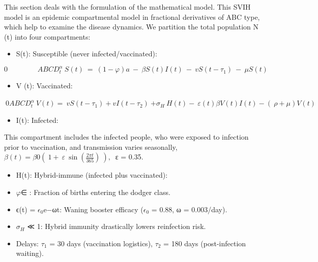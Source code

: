 \documentclass[10pt]{NSP1}
\begin{document}
\par\medskip{}\smallskip

This section deals with the formulation of the mathematical model. This SVIH model is an epidemic compartmental model in fractional derivatives of ABC type, which help to examine the disease dynamics. We partition the total population N (t) into four compartments:

\begin{itemize}
  \item S(t): Susceptible (never infected/vaccinated):
\end{itemize}

\begin{equation}
0\ \ \ \ \ \ \ \ \ \ \ \ \ \ \ \ \ \ \ ABCD_{t}^{\alpha}\ S(t)\  = \ (1 - \varphi)a\  - \ \beta S(t)I(t)\  - \ vS(t - \tau_{1})\  - \ \mu S(t)

\end{equation}

\begin{itemize}
  \item V (t): Vaccinated:
\end{itemize}

$\ 0ABCD_{t}^{\alpha}\ V(t) = \ vS\left( t - \tau_{1} \right) + vI\left( t - \tau_{2} \right)\ {+ \sigma}_{H}\ H(t) - \ \varepsilon(t)\beta V(t)I(t) - (\ \rho + \mu)V(t)$

\begin{itemize}
  \item I(t): Infected:
\end{itemize}

This compartment includes the infected people, who were exposed to infection prior to vaccination, and transmission varies seasonally, $\beta(t) = \beta 0\left( \ 1 + \ \varepsilon\ \sin\left( \frac{2\pi t}{365} \right)\  \right),\ $ ε = 0.35.

\begin{itemize}
  \item H(t): Hybrid-immune (infected plus vaccinated):
\end{itemize}

\begin{itemize}
  \item $\varphi$∈ \cite{ref1}: Fraction of births entering the dodger class.
  \item ϵ(t) = $\epsilon_{0}$e−ωt: Waning booster efficacy ($\epsilon_{0}$ = 0.88, ω = 0.003/day).
  \item $\sigma_{H}$ ≪ 1: Hybrid immunity drastically lowers reinfection risk.
  \item Delays: $\tau_{1}$ = 30 days (vaccination logistics), $\tau_{2}$ = 180 days (post-infection waiting).
\end{itemize}
\end{document}
